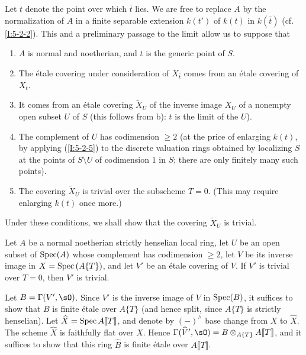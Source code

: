 Let $t$ denote the point over which $\bar t$ lies. We are free to replace
$A$ by the normalization of $A$ in a finite separable extension $k(t')$ of
$k(t)$ in $k(\bar t)$ (cf. \ref{I:5-2-2}). This and a preliminary
passage to the limit allow us to suppose that
\begin{enumerate}[\indent a)]
  \item $A$ is normal and noetherian, and $t$ is the generic point of $S$.
  \item The étale covering under consideration of $X_{\bar t}$ comes from
    an étale covering of $X_t$.
  \item It comes from an étale covering $\widetilde X_U$ of the inverse
    image $X_U$ of a nonempty open subset $U$ of $S$ (this follows from
    b): $t$ is the limit of the $U$).
  \item The complement of $U$ has codimension $\geqslant2$ (at the price
    of enlarging $k(t)$, by applying (\ref{I:5-2-5}) to the discrete
    valuation rings obtained by localizing $S$ at the points of
    $S\setminus U$ of codimension $1$ in $S$; there are only finitely many
    such points).
  \item The covering $\widetilde X_U$ is trivial over the subscheme $T=0$.
    (This may require enlarging $k(t)$ once more.)
\end{enumerate}

Under these conditions, we shall show that the covering
$\widetilde X_U$ is trivial.

\begin{lemma}\label{I:5-2-7} %
Let $A$ be a normal noetherian strictly henselian local ring, let $U$
be an open subset of $\operatorname{Spec}(A)$ whose complement has codimension
$\geqslant2$, let $V$ be its inverse image in
$X=\operatorname{Spec}\left(A\{T\}\right)$, and let $V'$ be an étale covering of
$V$. If $V'$ is trivial over $T=0$, then $V'$ is trivial.
\end{lemma}

Let $B=\Gamma(V',\sO)$. Since $V'$ is the inverse image of $V$ in
$\operatorname{Spec}(B)$, it suffices to show that $B$ is finite étale over $A\{T\}$
(and hence split, since $A\{T\}$ is strictly henselian). Let
$\widehat X=\operatorname{Spec} A\llbracket T\rrbracket$, and denote by $(-)^\wedge$ base
change from $X$ to $\widehat X$. The scheme $\widehat X$ is faithfully
flat over $X$. Hence
$\Gamma(\widehat V',\sO)=B\otimes_{A\{T\}}A\llbracket T\rrbracket$,
and it suffices to show that this ring $\widehat B$ is finite étale over
$A\llbracket T\rrbracket$.

